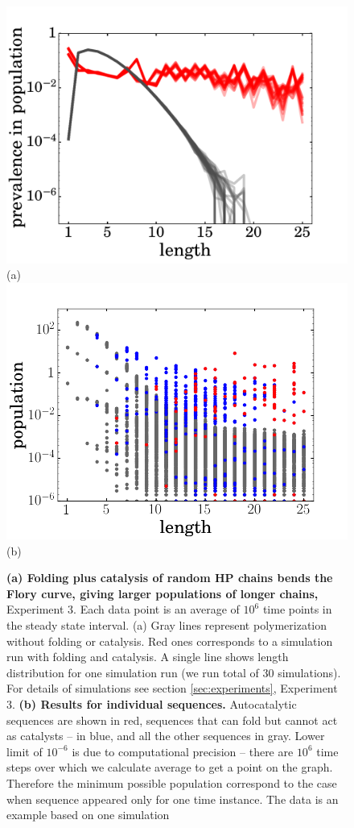 \documentclass[5p,times]{elsarticle}
\begin{document}
\begin{figure}[htb!]
  \centering
  \includegraphics[width=0.9\columnwidth]{pictures/distrHP-plain-many.pdf}(a) 
  \includegraphics[width=0.9\columnwidth]{pictures/scatter1837.png}(b) 
  \caption{\footnotesize{\textbf{(a) Folding plus catalysis of random HP chains bends the Flory 
curve, giving larger populations of longer chains,} Experiment 3.  Each data point is an average 
of $10^6$ time points in the steady state interval. (a) Gray lines represent polymerization without 
folding or catalysis. Red ones corresponds to a simulation run with folding and catalysis. A 
single line shows length distribution for one simulation run (we run total of 30 simulations). For 
details of simulations see section \ref{sec:experiments}, Experiment 3. \textbf{(b) Results for 
individual 
sequences.}  Autocatalytic sequences are shown in red, sequences that can fold but 
cannot act as  catalysts -- in blue, and all the other sequences in gray. Lower limit of $10^{-6}$ 
is due to computational precision -- there are $10^6$ time steps over which we calculate average 
to get a point on the graph. Therefore the minimum possible population correspond to the case when 
sequence appeared only for one time instance. The data is an example based on one simulation}}
  \label{fig:stats-scatter-018}
\end{figure}
\end{document}
